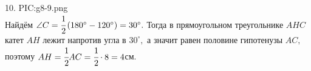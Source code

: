 10. {{PIC:g8-9.png}}\\
Найдём $\angle C=\cfrac{1}{2}\left(180^\circ-120^\circ\right)=30^\circ.$ Тогда в прямоугольном треугольнике $AHC$ катет $AH$ лежит напротив угла в $30^\circ,$ а значит равен половине гипотенузы $AC,$ поэтому $AH=\cfrac{1}{2}AC=\cfrac{1}{2}\cdot8=4$см.\\
